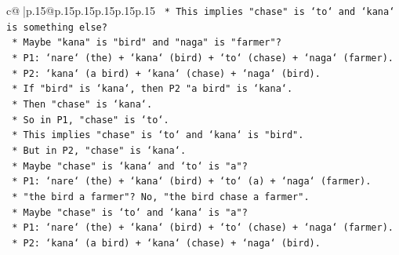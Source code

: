 \documentclass{article}
\begin{document}
{\begin{supertabular}{c@{$\;$}|p{.15\linewidth}@{}p{.15\linewidth}p{.15\linewidth}p{.15\linewidth}p{.15\linewidth}p{.15\linewidth}}
{{{\texttt{                                                                                *   This implies "chase" is `to` and `kana` is something else?} \\
\texttt{                                                                                *   Maybe "kana" is "bird" and "naga" is "farmer"?} \\
\texttt{                                                                                *   P1: `nare` (the) + `kana` (bird) + `to` (chase) + `naga` (farmer).} \\
\texttt{                                                                                *   P2: `kana` (a bird) + `kana` (chase) + `naga` (bird).} \\
\texttt{                                                                                *   If "bird" is `kana`, then P2 "a bird" is `kana`.} \\
\texttt{                                                                                *   Then "chase" is `kana`.} \\
\texttt{                                                                                *   So in P1, "chase" is `to`.} \\
\texttt{                                                                                *   This implies "chase" is `to` and `kana` is "bird".} \\
\texttt{                                                                                *   But in P2, "chase" is `kana`.} \\
\texttt{                                                                                *   Maybe "chase" is `kana` and `to` is "a"?} \\
\texttt{                                                                                *   P1: `nare` (the) + `kana` (bird) + `to` (a) + `naga` (farmer).} \\
\texttt{                                                                                *   "the bird a farmer"? No, "the bird chase a farmer".} \\
\texttt{                                                                                *   Maybe "chase" is `to` and `kana` is "a"?} \\
\texttt{                                                                                *   P1: `nare` (the) + `kana` (bird) + `to` (chase) + `naga` (farmer).} \\
\texttt{                                                                                *   P2: `kana` (a bird) + `kana` (chase) + `naga` (bird).} \\
}}}
\end{supertabular}}
\end{document}
